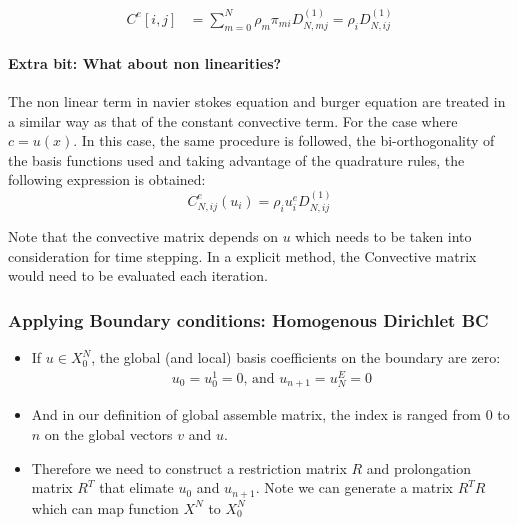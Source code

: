 \documentclass[
  a4paper,
  10pt]{article}
\begin{document}
\begin{align}
C^{e}[i,j]&=\sum_{m=0}^{N} \rho_m \pi_{mi}D^{(1)}_{N,mj}= \rho_iD^{(1)}_{N,ij} 
\end{align}

\hypertarget{extra-bit-what-about-non-linearities}{%
\paragraph{Extra bit: What about non
linearities?}\label{extra-bit-what-about-non-linearities}}

The non linear term in navier stokes equation and burger equation are
treated in a similar way as that of the constant convective term. For
the case where \(c=u(x)\). In this case, the same procedure is followed,
the bi-orthogonality of the basis functions used and taking advantage of
the quadrature rules, the following expression is obtained:
\begin{equation}
C^{e}_{N,ij}(u_i) =  \rho_i u_i^{e} D^{(1)}_{N,ij}
\end{equation}

Note that the convective matrix depends on \(u\) which needs to be taken
into consideration for time stepping. In a explicit method, the
Convective matrix would need to be evaluated each iteration.

\hypertarget{applying-boundary-conditions-homogenous-dirichlet-bc}{%
\subsubsection{Applying Boundary conditions: Homogenous Dirichlet
BC}\label{applying-boundary-conditions-homogenous-dirichlet-bc}}

\begin{itemize}
\item
  If \(u\in X_0^{N}\), the global (and local) basis coefficients on the
  boundary are zero: \begin{align}
  u_0 = u_0^1 = 0 \text{, and }u_{n+1} = u_N^E = 0
  \end{align}
\item
  And in our definition of global assemble matrix, the index is ranged
  from 0 to \(n\) on the global vectors \(v\) and \(u\).
\item
  Therefore we need to construct a restriction matrix \(R\) and
  prolongation matrix \(R^T\) that elimate \(u_0\) and \(u_{n+1}\). Note
  we can generate a matrix \(R^TR\) which can map function \(X^N\) to
  \(X^N_0\)
\end{itemize}
\end{document}
